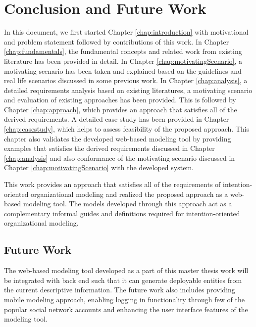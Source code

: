 \chapter{Conclusion and Future Work}
\label{chap:conclusion}

In this document, we first started Chapter \ref{chap:introduction} with motivational and problem statement followed by contributions of this work. In Chapter \ref{chap:fundamentals}, the fundamental concepts and related work from existing literature has been provided in detail. In Chapter \ref{chap:motivatingScenario}, a motivating scenario has been taken and explained based on the guidelines and real life scenarios discussed in some previous work. In Chapter \ref{chap:analysis}, a detailed requirements analysis based on existing literatures, a motivating scenario and evaluation of existing approaches has been provided. This is followed by Chapter \ref{chap:approach}, which provides an approach that satisfies all of the derived requirements. A detailed case study has been provided in Chapter \ref{chap:casestudy}, which helps to assess feasibility of the proposed approach. This chapter also validates the developed web-based modeling tool by providing examples that satisfies the derived requirements discussed in Chapter \ref{chap:analysis} and also conformance of the motivating scenario discussed in Chapter \ref{chap:motivatingScenario} with the developed system.

This work provides an approach that satisfies all of the requirements of intention-oriented organizational modeling and realized the proposed approach as a web-based modeling tool. The models developed through this approach act as a complementary informal guides and definitions required for intention-oriented organizational modeling. 

\section*{Future Work}
\label{sec:futurework}
The web-based modeling tool developed as a part of this master thesis work will be integrated with back end such that it can generate deployable entities from the current descriptive information. The future work also includes providing mobile modeling approach, enabling logging in functionality through few of the popular social network accounts and enhancing the user interface features of the modeling tool. 





